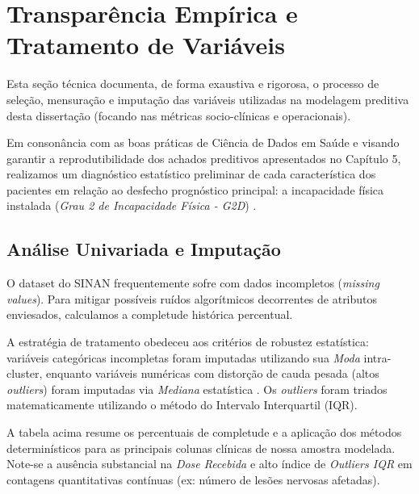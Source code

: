 \chapter{Transparência Empírica e Tratamento de Variáveis} %
\label{apendicea:metodologia}

Esta seção técnica documenta, de forma exaustiva e rigorosa, o processo de seleção, mensuração e imputação das variáveis utilizadas na modelagem preditiva desta dissertação (focando nas métricas socio-clínicas e operacionais).

Em consonância com as boas práticas de Ciência de Dados em Saúde e visando garantir a reprodutibilidade dos achados preditivos apresentados no Capítulo 5, realizamos um diagnóstico estatístico preliminar de cada característica dos pacientes em relação ao desfecho prognóstico principal: a incapacidade física instalada (\textit{Grau 2 de Incapacidade Física - G2D}) \cite{rocha_transparencia_2023, silva_cura_2024}.

\section{Análise Univariada e Imputação}

O dataset do SINAN frequentemente sofre com dados incompletos (\textit{missing values}). Para mitigar possíveis ruídos algorítmicos decorrentes de atributos enviesados, calculamos a completude histórica percentual.

A estratégia de tratamento obedeceu aos critérios de robustez estatística: variáveis categóricas incompletas foram imputadas utilizando sua \textit{Moda} intra-cluster, enquanto variáveis numéricas com distorção de cauda pesada (altos \textit{outliers}) foram imputadas via \textit{Mediana} estatística \cite{pereira2021imputation}. Os \textit{outliers} foram triados matematicamente utilizando o método do Intervalo Interquartil (IQR).

\begin{table}[H]
\centering
\caption{Métricas Descritivas e Tratamento de Variáveis (SINAN)}
\label{tab:missing_data}

\end{table}

A tabela acima resume os percentuais de completude e a aplicação dos métodos determinísticos para as principais colunas clínicas de nossa amostra modelada. Note-se a ausência substancial na \textit{Dose Recebida} e alto índice de \textit{Outliers IQR} em contagens quantitativas contínuas (ex: número de lesões nervosas afetadas).

